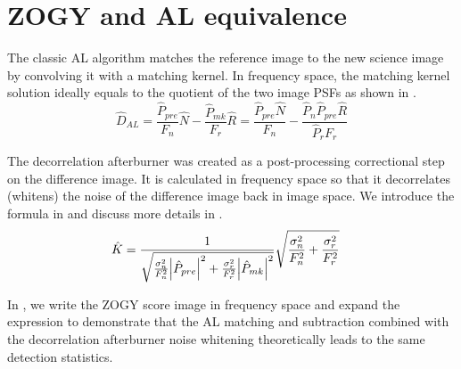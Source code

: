 \section{ZOGY and AL equivalence\label{sec:ALZOGYequiv}}
\par The classic AL algorithm matches the reference image to the new
science image by convolving it with a matching kernel. In frequency
space, the matching kernel solution ideally equals to the quotient of
the two image PSFs as shown in .
%
\begin{equation}
  \hat{D}_{AL} =
  \frac{\hat{P}_{pre}}{F_n}\hat{N} -
    \frac{\hat{P}_{mk}}{F_r}\hat{R}
  =
  \frac{\hat{P}_{pre}\hat{N}}{F_n} -
    \frac{\hat{P}_n\hat{P}_{pre}\hat{R}}{\hat{P}_r F_r}
                 \label{eq:Dal}
\end{equation}
%
\par The decorrelation afterburner was created as a post-processing
correctional step on the difference image. It is calculated in
frequency space so that it decorrelates (whitens) the noise of the
difference image back in image space. We introduce the formula in
 and discuss more details in .
%
\begin{align}
\hat{K}  &= \frac
  {1}
  {\sqrt{\frac{\sigma_n^2}{F_n^2}\abs{\hat{P}_{pre}}^2 +
      \frac{\sigma_r^2}{F_r^2}\abs{\hat{P}_{mk}}^2}}
  \sqrt{\frac{\sigma_n^2}{F_n^2} + \frac{\sigma_r^2}{F_r^2}}\label{eq:K}
\end{align}
%
\par In , we write the ZOGY score image in frequency
space and expand the expression to demonstrate that the AL matching
and subtraction combined with the decorrelation afterburner noise
whitening theoretically leads to the same detection statistics.
%
